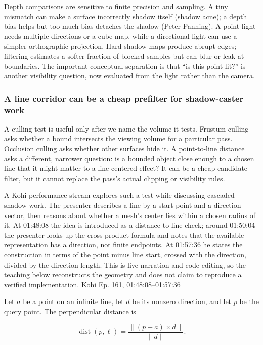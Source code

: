 Depth comparisons are sensitive to finite precision and sampling. A tiny mismatch can make a surface incorrectly shadow itself (shadow acne); a depth bias helps but too much bias detaches the shadow (Peter Panning). A point light needs multiple directions or a cube map, while a directional light can use a simpler orthographic projection. Hard shadow maps produce abrupt edges; filtering estimates a softer fraction of blocked samples but can blur or leak at boundaries. The important conceptual separation is that ``is this point lit?'' is another visibility question, now evaluated from the light rather than the camera.

\subsubsection{A line corridor can be a cheap prefilter for shadow-caster work}\label{a-line-corridor-can-be-a-cheap-prefilter-for-shadow-caster-work}

A culling test is useful only after we name the volume it tests. Frustum culling asks whether a bound intersects the viewing volume for a particular pass. Occlusion culling asks whether other surfaces hide it. A point-to-line distance asks a different, narrower question: is a bounded object close enough to a chosen line that it might matter to a line-centered effect? It can be a cheap candidate filter, but it cannot replace the pass's actual clipping or visibility rules.

A Kohi performance stream explores such a test while discussing cascaded shadow work. The presenter describes a line by a start point and a direction vector, then reasons about whether a mesh's center lies within a chosen radius of it. At 01:48:08 the idea is introduced as a distance-to-line check; around 01:50:04 the presenter looks up the cross-product formula and notes that the available representation has a direction, not finite endpoints. At 01:57:36 he states the construction in terms of the point minus line start, crossed with the direction, divided by the direction length. This is live narration and code editing, so the teaching below reconstructs the geometry and does not claim to reproduce a verified implementation. \href{https://www.youtube.com/watch?v=dJYWL9YAelY&t=6488s}{Kohi Ep. 161, 01:48:08--01:57:36}

Let \(a\) be a point on an infinite line, let \(d\) be its nonzero direction, and let \(p\) be the query point. The perpendicular distance is

\[
\operatorname{dist}(p,\ell)=\frac{\|(p-a)\times d\|}{\|d\|}.
\]

